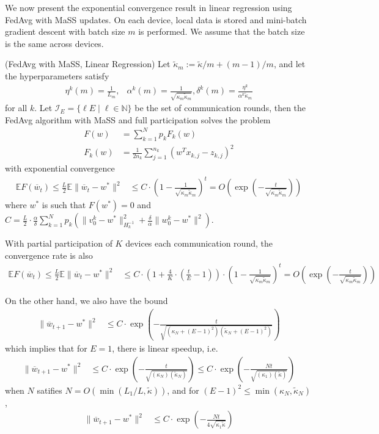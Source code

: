 We now present the exponential convergence result in linear regression
using FedAvg with MaSS updates. On each device, local data is stored
and mini-batch gradient descent with batch size $m$ is performed.
We assume that the batch size is the same across devices. 
\begin{theorem}
	(FedAvg with MaSS, Linear Regression) Let $\tilde{\kappa}_{m}:=\tilde{\kappa}/m+(m-1)/m$,
	and let the hyperparameters satisfy 
	\begin{align*}
	\eta^{k}(m)=\frac{1}{L_{m}}, & \alpha^{k}(m)=\frac{1}{\sqrt{\kappa_{m}\tilde{\kappa}_{m}}},\delta^{k}(m)=\frac{\eta^{k}}{\alpha^{k}\tilde{\kappa}_{m}}
	\end{align*}
	for all $k$. Let $\mathcal{I}_{E}=\{\ell E\mid\ell\in\mathbb{N}\}$
	be the set of communication rounds, then the FedAvg algorithm with
	MaSS and full participation solves the problem 
	\begin{align*}
	F(w) & =\sum_{k=1}^{N}p_{k}F_{k}(w)\\
	F_{k}(w) & =\frac{1}{2n_{k}}\sum_{j=1}^{n_{k}}(w^{T}x_{k,j}-z_{k,j})^{2}
	\end{align*}
	with exponential convergence
	\begin{align*}
	\mathbb{E}F(\overline{w}_{t})\leq\frac{L}{2}\mathbb{E}\|\overline{w}_{t}-w^{\ast}\|^{2} & \leq C\cdot(1-\frac{1}{\sqrt{\kappa_{m}\tilde{\kappa}_{m}}})^{t}=O(\exp(-\frac{t}{\sqrt{\kappa_{m}\tilde{\kappa}_{m}}}))
	\end{align*}
	where $w^{\ast}$ is such that $F(w^{\ast})=0$ and $C=\frac{L}{2}\cdot\frac{\alpha}{\delta}\sum_{k=1}^{N}p_{k}(\|v_{0}^{k}-w^{\ast}\|_{H_{k}^{-1}}^{2}+\frac{\delta}{\alpha}\|w_{0}^{k}-w^{\ast}\|^{2})$. 
	
	With partial participation of $K$ devices each communication round,
	the convergence rate is also 
	\begin{align*}
	\mathbb{E}F(\overline{w}_{t})\leq\frac{L}{2}\mathbb{E}\|\overline{w}_{t}-w^{\ast}\|^{2} & \leq C\cdot(1+\frac{4}{K}\cdot(\frac{t}{E}-1))\cdot(1-\frac{1}{\sqrt{\kappa_{m}\tilde{\kappa}_{m}}})^{t}=O(\exp(-\frac{t}{\sqrt{\kappa_{m}\tilde{\kappa}_{m}}}))
	\end{align*}
	
	On the other hand, we also have the bound
	\begin{align*}
	\|\overline{w}_{t+1}-w^{\ast}\|^{2} & \leq C\cdot\exp(-\frac{t}{\sqrt{(\kappa_{N}+(E-1)^{2})(\tilde{\kappa}_{N}+(E-1)^{2})}})
	\end{align*}
	which implies that for $E=1$, there is linear speedup, i.e. 
	\begin{align*}
	\|\overline{w}_{t+1}-w^{\ast}\|^{2} & \leq C\cdot\exp(-\frac{t}{\sqrt{(\kappa_{N})(\tilde{\kappa}_{N})}})\leq C\cdot\exp(-\frac{Nt}{\sqrt{(\kappa_{1})(\tilde{\kappa})}})
	\end{align*}
	when $N$ satifies $N=O(\min(L_{1}/L,\tilde{\kappa}))$, and for $(E-1)^{2}\leq\min(\kappa_{N},\tilde{\kappa}_{N})$,
	\begin{align*}
	\|\overline{w}_{t+1}-w^{\ast}\|^{2} & \leq C\cdot\exp(-\frac{Nt}{4\sqrt{\kappa_{1}\tilde{\kappa}}})
	\end{align*}
\end{theorem}
